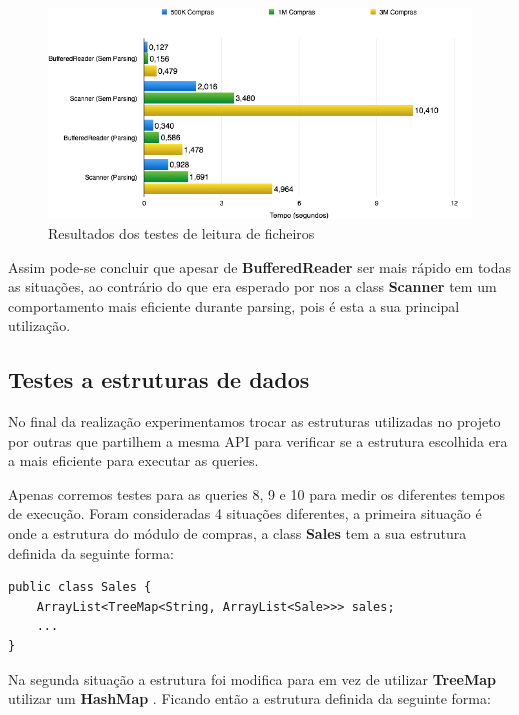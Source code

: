 \documentclass[10pt] {article}
\begin{document}
\begin{figure}[ht!]
\centering
\includegraphics[width=150mm]{filegraph.png}
\caption{Resultados dos testes de leitura de ficheiros}
\label{fig:sales}
\end{figure}

\newpage

\par Assim pode-se concluir que apesar de  \color{blue} \textbf{BufferedReader} \color{black} ser mais rápido em todas as
situações, ao contrário do que era esperado por nos a class  \color{blue} \textbf{Scanner} \color{black} tem um comportamento
mais eficiente durante parsing, pois é esta a sua principal utilização.

\subsection{Testes a estruturas de dados}
\par No final da realização experimentamos trocar as estruturas utilizadas no projeto por outras que partilhem a mesma API
para verificar se a estrutura escolhida era a mais eficiente para executar as queries.
\par Apenas corremos testes para as queries 8, 9 e 10 para medir os diferentes tempos de execução.
Foram consideradas 4 situações diferentes, a primeira situação é onde a estrutura do módulo de
compras, a class \color{blue} \textbf{Sales} \color{black} tem a sua estrutura definida da seguinte forma:

\begin{lstlisting}
public class Sales {
	ArrayList<TreeMap<String, ArrayList<Sale>>> sales;
	...
}
\end{lstlisting}

\par Na segunda situação a estrutura foi modifica para em vez de utilizar \color{blue} \textbf{TreeMap} \color{black} utilizar um
\color{blue} \textbf{HashMap} \color{black} . Ficando então a estrutura definida da seguinte forma:
\end{document}
